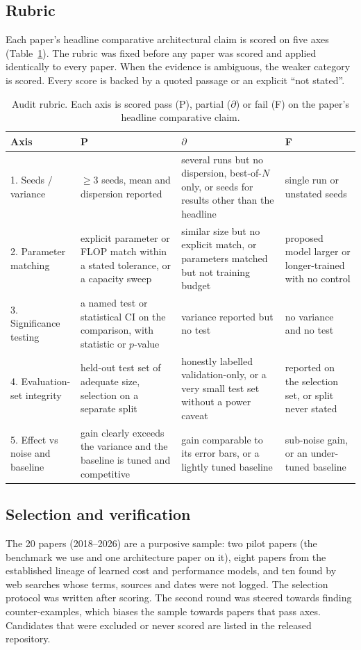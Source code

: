 \documentclass{article}
\begin{document}
\subsection{Rubric}
Each paper's headline comparative architectural claim is scored on five axes (Table~\ref{tab:rubric}).
The rubric was fixed before any paper was scored and applied identically to every paper. When the
evidence is ambiguous, the weaker category is scored. Every score is backed by a quoted passage or
an explicit ``not stated''.

\begin{table}[t]
\caption{Audit rubric. Each axis is scored pass (P), partial ($\partial$) or fail (F) on the paper's
headline comparative claim.}
\label{tab:rubric}
\centering
\small
\begin{tabular}{p{2.6cm}p{4.6cm}p{4.6cm}p{4.2cm}}
\toprule
Axis & P & $\partial$ & F \\
\midrule
1. Seeds / variance & $\geq$3 seeds, mean and dispersion reported & several runs but no dispersion, best-of-$N$
  only, or seeds for results other than the headline & single run or unstated seeds \\
2. Parameter matching & explicit parameter or FLOP match within a stated tolerance, or a capacity sweep
  & similar size but no explicit match, or parameters matched but not training budget & proposed model
  larger or longer-trained with no control \\
3. Significance testing & a named test or statistical CI on the comparison, with statistic or $p$-value
  & variance reported but no test & no variance and no test \\
4. Evaluation-set integrity & held-out test set of adequate size, selection on a separate split & honestly
  labelled validation-only, or a very small test set without a power caveat & reported on the selection
  set, or split never stated \\
5. Effect vs noise and baseline & gain clearly exceeds the variance and the baseline is tuned and
  competitive & gain comparable to its error bars, or a lightly tuned baseline & sub-noise gain, or an
  under-tuned baseline \\
\bottomrule
\end{tabular}
\end{table}

\subsection{Selection and verification}
The 20 papers (2018--2026) are a purposive sample: two pilot papers (the benchmark we use and one
architecture paper on it), eight papers from the established lineage of learned cost and performance
models, and ten found by web searches whose terms, sources and dates were not logged. The selection
protocol was written after scoring. The second round was steered towards finding counter-examples,
which biases the sample towards papers that pass axes. Candidates that were excluded or never scored
are listed in the released repository.
\end{document}
